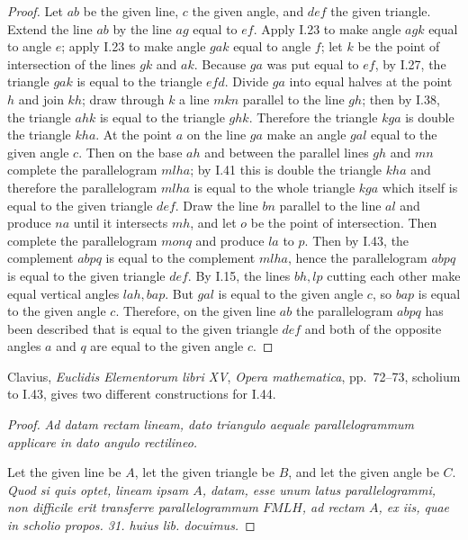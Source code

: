 \documentclass{article}
\begin{document}
\begin{proof}
Let $ab$ be the given line, $c$ the given angle, and $def$ the given triangle.
Extend the line $ab$ by the line $ag$ equal to $ef$. 
Apply I.23 to make angle $agk$ equal to angle $e$;
apply I.23 to make angle $gak$ equal to angle $f$; 
let $k$ be the point of intersection of the lines $gk$ and $ak$. 
Because $ga$ was put equal to $ef$, by I.27, the triangle $gak$ is equal to the triangle $efd$.
Divide $ga$ into equal halves at the point $h$ and join $kh$; draw through $k$ a line $mkn$ parallel to the line $gh$;
then by I.38, the triangle $ahk$ is equal to the triangle $ghk$. Therefore the triangle $kga$ is double the triangle $kha$.
At the point $a$ on the line $ga$ make an angle $gal$ equal to the given angle $c$. Then on the base
$ah$ and between the parallel lines $gh$ and $mn$ complete the parallelogram $mlha$; by I.41 this is double the triangle $kha$ and therefore
the parallelogram $mlha$ is equal to the whole triangle $kga$ which itself is equal to the given triangle $def$.
Draw the line  $bn$ parallel to the line $al$ and produce $na$ until it intersects $mh$, and let $o$ be the point of intersection.
Then complete the parallelogram $monq$ and produce $la$ to $p$. Then by I.43,
the complement $abpq$ is equal to the complement $mlha$, hence
the parallelogram $abpq$ is equal to the given triangle $def$. 
By I.15, the lines $bh,lp$ cutting each other make equal vertical angles 
$lah,bap$.  But $gal$ is equal to the given angle $c$, so $bap$ is equal to the given angle $c$. 
Therefore, on the given line $ab$ the parallelogram $abpq$ has been described that is equal to the given triangle $def$
and both of the opposite angles $a$ and $q$ are equal to the given angle $c$. 
\end{proof}

Clavius, {\em Euclidis Elementorum libri XV}, {\em Opera mathematica}, pp.~72--73, scholium to I.43, gives two different
constructions for I.44.

\begin{proof}
{\em Ad datam rectam lineam, dato triangulo aequale
parallelogrammum applicare in dato angulo rectilineo.}

Let the given line be $A$, let the given triangle be $B$, and let
the given angle be $C$.
{\em Quod si quis optet, lineam ipsam $A$, datam, esse unum
latus parallelogrammi, non difficile erit
transferre parallelogrammum $FMLH$, ad rectam $A$, ex
iis, quae in scholio propos. 31. huius lib. docuimus.}
\end{proof}
 
\end{document}
